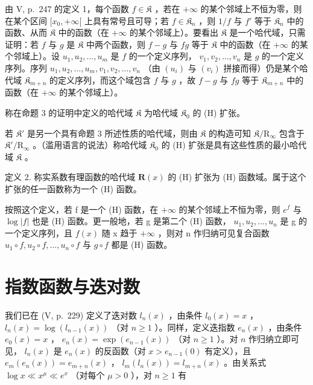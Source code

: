 由 V, p.~247 的定义 1，每个函数 \(f \in \mathfrak{K}\) ，若在 \(+\infty\) 的某个邻域上不恒为零，则在某个区间 \([x_0, +\infty[\) 上具有常号且可导；若 \(f \in \mathfrak{K}_n\) ，则 \(1/f\) 与 \(f'\) 等于 \(\mathfrak{K}_n\) 中的函数、从而 \(\mathfrak{K}\) 中的函数（在 \(+\infty\) 的某个邻域上）。要看出 \(\mathfrak{K}\) 是一个哈代域，只需证明：若 \(f\) 与 \(g\) 是 \(\mathfrak{K}\) 中两个函数，则 \(f - g\) 与 \(fg\) 等于 \(\mathfrak{K}\) 中的函数（在 \(+\infty\) 的某个邻域上）。设 \(u_1, u_2, \ldots, u_m\) 是 \(f\) 的一个定义序列， \(v_1, v_2, \ldots, v_n\) 是 \(g\) 的一个定义序列。序列 \(u_1, u_2, \ldots, u_m, v_1, v_2, \ldots, v_n\) （由 \((u_i)\) 与 \((v_i)\) 拼接而得）仍是某个哈代域 \(\mathfrak{K}_{m+n}\) 的定义序列，而这个域包含 \(f\) 与 \(g\) ，故 \(f - g\) 与 \(fg\) 等于 \(\mathfrak{K}_{m+n}\) 中的函数（在 \(+\infty\) 的某个邻域上）。

称在命题 3 的证明中定义的哈代域 \(\mathfrak{K}\) 为哈代域 \(\mathfrak{K}_0\) 的 (H) 扩张。

若 \(\mathfrak{K}'\) 是另一个具有命题 3 所述性质的哈代域，则由 \(\mathfrak{K}\) 的构造可知 \(\mathfrak{K} / \mathrm{R}_{\infty}\) 包含于 \(\mathfrak{K}' / \mathrm{R}_{\infty}\) 。（滥用语言的说法）称哈代域 \(\mathfrak{K}_0\) 的 (H) 扩张是具有这些性质的最小哈代域 \(\mathfrak{K}\) 。

定义 2. 称实系数有理函数的哈代域 \(\mathbf{R}(x)\) 的 (H) 扩张为 (H) 函数域。属于这个扩张的任一函数称为一个 (H) 函数。

按照这个定义，若 f 是一个 (H) 函数，在 \(+\infty\) 的某个邻域上不恒为零，则 \(e^{f}\) 与 \(\log |f|\) 也是 (H) 函数。更一般地，若 g 是第二个 (H) 函数， \(u_{1}, u_{2}, \ldots, u_{n}\) 是 g 的一个定义序列，且 \(f(x)\) 随 x 趋于 \(+\infty\) ，则对 n 作归纳可见复合函数 \(u_{1} \circ f, u_{2} \circ f, \ldots, u_{n} \circ f\) 与 \(g \circ f\) 都是 (H) 函数。

\section{指数函数与迭对数}

我们已在 (V, p.~229) 定义了迭对数 \(l_n(x)\) ，由条件 \(l_0(x) = x\) ， \(l_n(x) = \log(l_{n-1}(x))\) （对 \(n \geqslant 1\) ）。同样，定义迭指数 \(e_n(x)\) ，由条件 \(e_0(x) = x\) ， \(e_n(x) = \exp(e_{n-1}(x))\) （对 \(n \geqslant 1\) ）。对 \(n\) 作归纳立即可见， \(l_n(x)\) 是 \(e_n(x)\) 的反函数（对 \(x > e_{n-1}(0)\) 有定义），且 \(e_m(e_n(x)) = e_{m+n}(x)\) ， \(l_m(l_n(x)) = l_{m+n}(x)\) 。由关系式 \(\log x \ll x^\mu \ll e^x\) （对每个 \(\mu > 0\) ），对 \(n \geqslant 1\) 有

